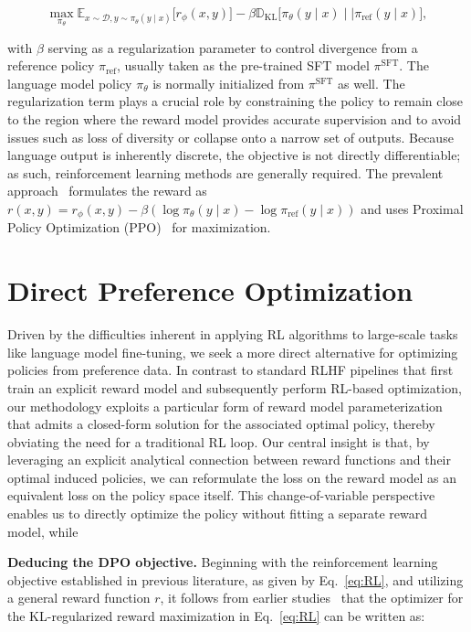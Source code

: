 \begin{equation}\label{eq:RL}
\max_{\pi_{\theta}}  \mathbb{E}_{x\sim \mathcal{D}, y\sim \pi_{\theta}(y \mid x)}\bigl[r_{\phi}(x, y)\bigr] - \beta\mathbb{D}_{\textrm{KL}}\bigl[\pi_{\theta}(y\mid x)\mid \mid \pi_\text{ref}(y\mid x)\bigr],
\end{equation}

with $\beta$ serving as a regularization parameter to control divergence from a reference policy $\pi_\text{ref}$, usually taken as the pre-trained SFT model $\pi^\text{SFT}$. The language model policy $\pi_\theta$ is normally initialized from $\pi^\text{SFT}$ as well. The regularization term plays a crucial role by constraining the policy to remain close to the region where the reward model provides accurate supervision and to avoid issues such as loss of diversity or collapse onto a narrow set of outputs. Because language output is inherently discrete, the objective is not directly differentiable; as such, reinforcement learning methods are generally required. The prevalent approach~\citep{ziegler2020finetuning, stiennon2022learning, bai2022training, ouyang2022training} formulates the reward as ${r(x, y) = r_{\phi}(x, y) -\beta (\log \pi_{\theta}(y\mid x) - \log \pi_\text{ref}(y\mid x))}$ and uses Proximal Policy Optimization (PPO)~\cite{schulman2017proximal} for maximization.

\section{Direct Preference Optimization}\label{sec:DPO}

Driven by the difficulties inherent in applying RL algorithms to large-scale tasks like language model fine-tuning, we seek a more direct alternative for optimizing policies from preference data. In contrast to standard RLHF pipelines that first train an explicit reward model and subsequently perform RL-based optimization, our methodology exploits a particular form of reward model parameterization that admits a closed-form solution for the associated optimal policy, thereby obviating the need for a traditional RL loop. Our central insight is that, by leveraging an explicit analytical connection between reward functions and their optimal induced policies, we can reformulate the loss on the reward model as an equivalent loss on the policy space itself. This change-of-variable perspective enables us to directly optimize the policy without fitting a separate reward model, while

\textbf{Deducing the DPO objective.} Beginning with the reinforcement learning objective established in previous literature, as given by Eq.~\ref{eq:RL}, and utilizing a general reward function $r$, it follows from earlier studies~\citep{peters2007reinforcement, peng2019advantage, korbak2022reinforcement, go2023aligning} that the optimizer for the KL-regularized reward maximization in Eq.~\ref{eq:RL} can be written as:

